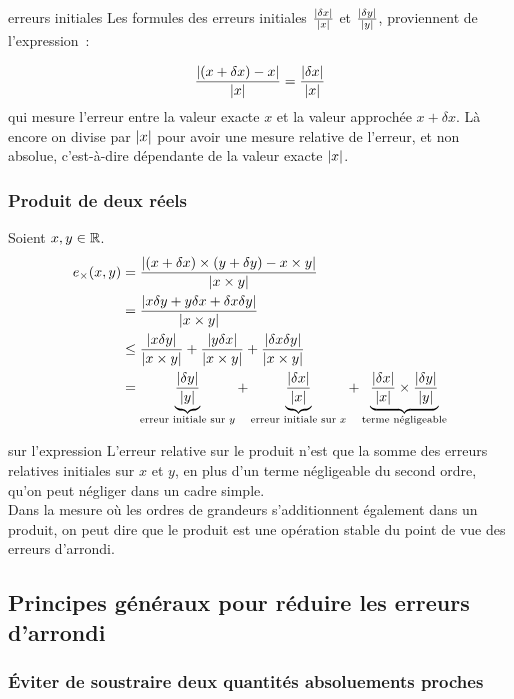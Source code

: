 \begin{remarque}{}{erreurs initiales}
    Les formules des erreurs initiales $\frac{|\delta x|}{|x|}$ et $\frac{|\delta y|}{|y|}$, proviennent de l'expression~:

    $$\frac{|(x + \delta x) - x|}{|x|} = \frac{|\delta x|}{|x|} $$
    qui mesure l'erreur entre la valeur exacte $x$ et la valeur approchée $x + \delta x$. Là encore on divise par $|x|$ pour avoir une mesure relative de l'erreur, et non absolue, c'est-à-dire dépendante de la valeur exacte $|x|$.
    
\end{remarque}

\subsubsection{Produit de deux réels}
Soient $x,y \in \mathbb{R}$. 
\begin{align*}
e_\times(x,y) &= \frac{|(x+\delta x) \times (y + \delta y) - x \times y|}{|x \times y|}\\
  &= \frac{|x \delta y + y \delta x + \delta x \delta y|}{|x \times y|}\\
  &\le \frac{|x \delta y|}{|x \times y|} + \frac{|y \delta x|}{|x \times y|} + \frac{|\delta x \delta y|}{|x \times y|}\\
  &= \underbrace{\frac{|\delta y|}{|y|}}_{\text{erreur initiale sur $y$}}
     + \underbrace{\frac{|\delta x|}{|x|}}_{\text{erreur initiale sur $x$}}
     + \underbrace{\frac{|\delta x|}{|x|} \times \frac{|\delta y|}{|y|}}_{\text{terme négligeable}}
\end{align*}
\begin{remarque}{}{sur l'expression}
    L'erreur relative sur le produit n'est que la somme des erreurs relatives initiales sur $x$ et $y$, en plus d'un terme négligeable du second ordre, qu'on peut négliger dans un cadre simple.\\
    Dans la mesure où les ordres de grandeurs s'additionnent également dans un produit, on peut dire que le produit est une opération stable du point de vue des erreurs d'arrondi.
\end{remarque}

\subsection{Principes généraux pour réduire les erreurs d'arrondi}

\subsubsection{Éviter de soustraire deux quantités absoluements proches}

